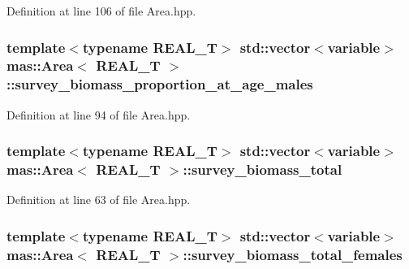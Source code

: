 Definition at line 106 of file Area.\-hpp.

\hypertarget{structmas_1_1_area_a11cdc9068612b7e08790a2ba50460e53}{
\subsubsection[{survey\-\_\-biomass\-\_\-proportion\-\_\-at\-\_\-age\-\_\-males}]{\setlength{\rightskip}{0pt plus 5cm}template$<$typename R\-E\-A\-L\-\_\-\-T$>$ std\-::vector$<${\bf variable}$>$ {\bf mas\-::\-Area}$<$ R\-E\-A\-L\-\_\-\-T $>$\-::survey\-\_\-biomass\-\_\-proportion\-\_\-at\-\_\-age\-\_\-males}}\label{structmas_1_1_area_a11cdc9068612b7e08790a2ba50460e53}


Definition at line 94 of file Area.\-hpp.

\hypertarget{structmas_1_1_area_a59bb446f6c932a2255fe8093d731e403}{
\subsubsection[{survey\-\_\-biomass\-\_\-total}]{\setlength{\rightskip}{0pt plus 5cm}template$<$typename R\-E\-A\-L\-\_\-\-T$>$ std\-::vector$<${\bf variable}$>$ {\bf mas\-::\-Area}$<$ R\-E\-A\-L\-\_\-\-T $>$\-::survey\-\_\-biomass\-\_\-total}}\label{structmas_1_1_area_a59bb446f6c932a2255fe8093d731e403}


Definition at line 63 of file Area.\-hpp.

\hypertarget{structmas_1_1_area_ac9e78d0a2d1fbb1d24d2a92205b9ec16}{
\subsubsection[{survey\-\_\-biomass\-\_\-total\-\_\-females}]{\setlength{\rightskip}{0pt plus 5cm}template$<$typename R\-E\-A\-L\-\_\-\-T$>$ std\-::vector$<${\bf variable}$>$ {\bf mas\-::\-Area}$<$ R\-E\-A\-L\-\_\-\-T $>$\-::survey\-\_\-biomass\-\_\-total\-\_\-females}}\label{structmas_1_1_area_ac9e78d0a2d1fbb1d24d2a92205b9ec16}


